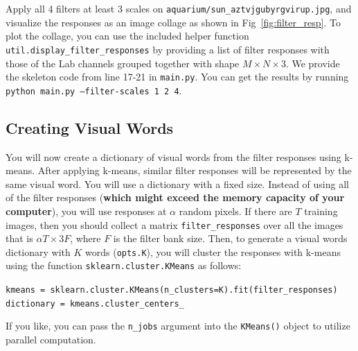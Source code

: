\documentclass[11pt]{article}
\makeatletter
\numberwithin{equation}{section} %
\numberwithin{figure}{section} %
\numberwithin{table}{section} %
\DeclareRobustCommand\onedot{\futurelet\@let@token\@onedot}
\def\@onedot{\ifx\@let@token.\else.\null\fi\xspace}
\def\ie{\emph{i.e}\onedot} \def\Ie{\emph{I.e}\onedot}
\makeatother
\begin{document}
Apply all 4 filters at least 3 scales on {\tt aquarium/sun\_aztvjgubyrgvirup.jpg}, and visualize the responses as an image collage as shown in Fig~\ref{fig:filter_resp}. To plot the collage, you can use the included helper function {\tt util.display\_filter\_responses} by providing a list of filter responses with those of the Lab channels grouped together with shape $M \times N \times 3$. We provide the skeleton code from line 17-21 in {\tt main.py}. You can get the results by running {\tt python main.py --filter-scales 1 2 4}.



\begin{your_solution}[title=Q1.1.2,height=17cm,width=\linewidth]

\end{your_solution}

\subsection{Creating Visual Words}
You will now create a dictionary of visual words from the filter responses using k-means. After applying k-means, similar filter responses will be represented by the same visual word. You will use a dictionary with a fixed size. Instead of using all of the filter responses ({\bf which might exceed the memory capacity of your computer}), you will use responses at $\alpha$ random pixels. If there are $T$ training images, then you should collect a matrix {\tt filter\_responses} over all the images that is $\alpha T \times 3F$, where $F$ is the filter bank size.
Then, to generate a visual words dictionary with $K$ words ({\tt opts.K}), you will cluster the responses with k-means using the function {\tt sklearn.cluster.KMeans} as follows:
\begin{center}
    {\tt kmeans = sklearn.cluster.KMeans(n\_clusters=K).fit(filter\_responses) \\
    dictionary = kmeans.cluster\_centers\_ }
\end{center}
If you like, you can pass the {\tt n\_jobs} argument into the {\tt KMeans()} object to utilize parallel computation. \\

\end{document}
